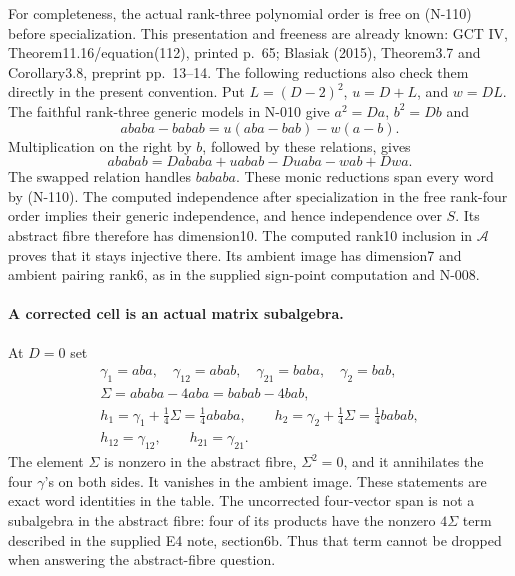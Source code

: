 For completeness, the actual rank-three polynomial order is
free on (N-110) before specialization.  This presentation and
freeness are already known: GCT IV, Theorem11.16/equation(112),
printed p.~65; Blasiak (2015), Theorem3.7 and Corollary3.8,
preprint pp.~13--14.  The following reductions also check them
directly in the present convention.  Put
$L=(D-2)^2$, $u=D+L$, and $w=DL$.
The faithful rank-three generic models in N-010 give
$a^2=Da$, $b^2=Db$ and
\[
 ababa-babab=u(aba-bab)-w(a-b).
\]
Multiplication on the right by $b$, followed by these relations,
gives
\[
 ababab=Dababa+uabab-Duaba-wab+Dwa.
\]
The swapped relation handles $bababa$.  These monic reductions
span every word by (N-110).  The computed independence after
specialization in the free rank-four order implies their generic
independence, and hence independence over $S$.
Its abstract fibre therefore has dimension10.  The computed
rank10 inclusion in $\mathcal A$ proves that it stays injective
there.  Its ambient image has dimension7 and ambient pairing
rank6, as in the supplied sign-point computation and N-008.

\paragraph{A corrected cell is an actual matrix subalgebra.}
At $D=0$ set
\[
 \begin{gathered}
 \gamma_1=aba,\quad\gamma_{12}=abab,\quad
 \gamma_{21}=baba,\quad\gamma_2=bab,\\
 \Sigma=ababa-4aba=babab-4bab,\\
 h_1=\gamma_1+\tfrac14\Sigma=\tfrac14ababa,\qquad
 h_2=\gamma_2+\tfrac14\Sigma=\tfrac14babab,\\
 h_{12}=\gamma_{12},\qquad h_{21}=\gamma_{21}.
 \end{gathered}
 \tag{N-111}
\]
The element $\Sigma$ is nonzero in the abstract fibre,
$\Sigma^2=0$, and it annihilates the four $\gamma$'s on both
sides.  It vanishes in the ambient image.  These statements
are exact word identities in the table.  The uncorrected
four-vector span is not a subalgebra in the abstract fibre:
four of its products have the nonzero $4\Sigma$ term described
in the supplied E4 note, section6b.  Thus that term cannot be
dropped when answering the abstract-fibre question.


